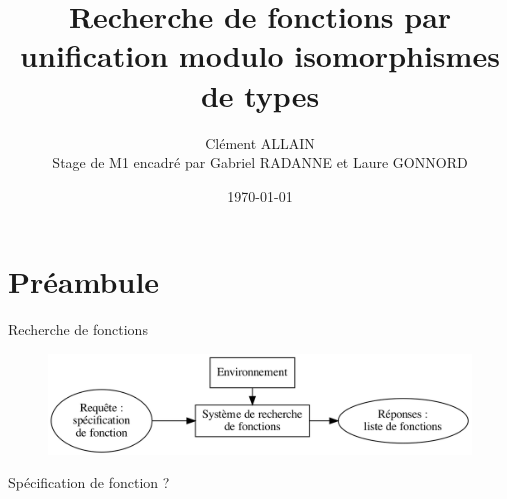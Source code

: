 \documentclass[serif]{beamer}
\title{Recherche de fonctions par \\ unification modulo isomorphismes de types}
\author{Clément ALLAIN \\ Stage de M1 encadré par Gabriel RADANNE et Laure GONNORD}
\date{\today}
\begin{document}

\begin{frame}
\titlepage
\end{frame}


\begin{frame}
\tableofcontents
\end{frame}


\section{Préambule}


\begin{frame}{Recherche de fonctions}
\begin{figure}[h]
 	\centering
 	\includegraphics[scale=0.2]{graphs/recherche_fonction}
\end{figure}
\centering
Spécification de fonction ?
\end{frame}

\end{document}
